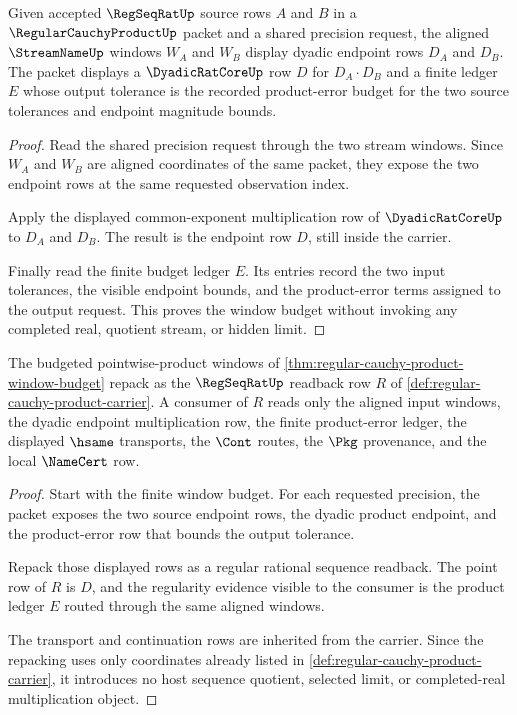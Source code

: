 \begin{theorem}
\label{thm:regular-cauchy-product-window-budget}
Given accepted $\RegSeqRatUp$ source rows $A$ and $B$ in a $\RegularCauchyProductUp$ packet and a shared precision request, the aligned $\StreamNameUp$ windows $W_A$ and $W_B$ display dyadic endpoint rows $D_A$ and $D_B$. The packet displays a $\DyadicRatCoreUp$ row $D$ for $D_A \cdot D_B$ and a finite ledger $E$ whose output tolerance is the recorded product-error budget for the two source tolerances and endpoint magnitude bounds.
\end{theorem}
\begin{proof}
Read the shared precision request through the two stream windows. Since $W_A$ and $W_B$ are aligned coordinates of the same packet, they expose the two endpoint rows at the same requested observation index.

Apply the displayed common-exponent multiplication row of $\DyadicRatCoreUp$ to $D_A$ and $D_B$. The result is the endpoint row $D$, still inside the carrier.

Finally read the finite budget ledger $E$. Its entries record the two input tolerances, the visible endpoint bounds, and the product-error terms assigned to the output request. This proves the window budget without invoking any completed real, quotient stream, or hidden limit.
\end{proof}

\begin{theorem}
\label{thm:regular-cauchy-product-regseqrat-handoff}
The budgeted pointwise-product windows of \autoref{thm:regular-cauchy-product-window-budget} repack as the $\RegSeqRatUp$ readback row $R$ of \autoref{def:regular-cauchy-product-carrier}. A consumer of $R$ reads only the aligned input windows, the dyadic endpoint multiplication row, the finite product-error ledger, the displayed $\hsame$ transports, the $\Cont$ routes, the $\Pkg$ provenance, and the local $\NameCert$ row.
\end{theorem}
\begin{proof}
Start with the finite window budget. For each requested precision, the packet exposes the two source endpoint rows, the dyadic product endpoint, and the product-error row that bounds the output tolerance.

Repack those displayed rows as a regular rational sequence readback. The point row of $R$ is $D$, and the regularity evidence visible to the consumer is the product ledger $E$ routed through the same aligned windows.

The transport and continuation rows are inherited from the carrier. Since the repacking uses only coordinates already listed in \autoref{def:regular-cauchy-product-carrier}, it introduces no host sequence quotient, selected limit, or completed-real multiplication object.
\end{proof}


